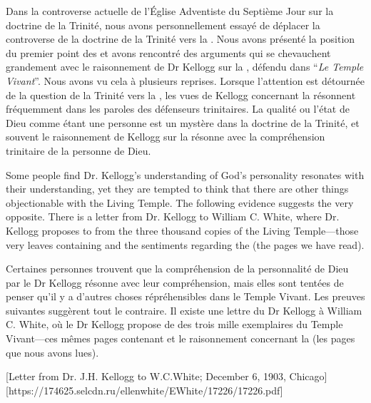 Dans la controverse actuelle de l'Église Adventiste du Septième Jour sur la doctrine de la Trinité, nous avons personnellement essayé de déplacer la controverse de la doctrine de la Trinité vers la . Nous avons présenté la position du premier point des  et avons rencontré des arguments qui se chevauchent grandement avec le raisonnement de Dr Kellogg sur la , défendu dans “\textit{Le Temple Vivant}”. Nous avons vu cela à plusieurs reprises. Lorsque l'attention est détournée de la question de la Trinité vers la , les vues de Kellogg concernant la  résonnent fréquemment dans les paroles des défenseurs trinitaires. La qualité ou l'état de Dieu comme étant une personne est un mystère dans la doctrine de la Trinité, et souvent le raisonnement de Kellogg sur la  résonne avec la compréhension trinitaire de la personne de Dieu.


Some people find Dr. Kellogg’s understanding of God’s personality resonates with their understanding, yet they are tempted to think that there are other things objectionable with the Living Temple. The following evidence suggests the very opposite. There is a letter from Dr. Kellogg to William C. White, where Dr. Kellogg proposes to  from the three thousand copies of the Living Temple—those very leaves containing and the sentiments regarding the  (the pages we have read).


Certaines personnes trouvent que la compréhension de la personnalité de Dieu par le Dr Kellogg résonne avec leur compréhension, mais elles sont tentées de penser qu'il y a d'autres choses répréhensibles dans le Temple Vivant. Les preuves suivantes suggèrent tout le contraire. Il existe une lettre du Dr Kellogg à William C. White, où le Dr Kellogg propose de  des trois mille exemplaires du Temple Vivant—ces mêmes pages contenant  et le raisonnement concernant la  (les pages que nous avons lues).


[Letter from Dr. J.H. Kellogg to W.C.White; December 6, 1903, Chicago][https://174625.selcdn.ru/ellenwhite/EWhite/17226/17226.pdf]


